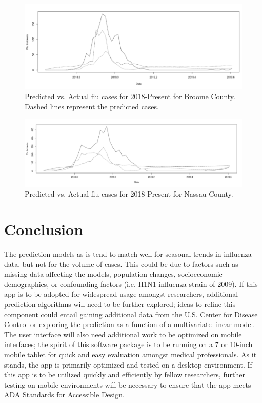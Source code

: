 \documentclass[12pt]{article}
\begin{document}
\begin{figure}[H]
\centering
\includegraphics{Picture5.png}
\caption{Predicted vs. Actual flu cases for 2018-Present for Broome County. Dashed lines represent the predicted cases.}\label{fig:broome}
\end{figure}

\begin{figure}[H]
\centering
\includegraphics{Picture6.png}
\caption{Predicted vs. Actual flu cases for 2018-Present for Nassau County.}\label{fig:nassau}
\end{figure}
 
\section{Conclusion}

The prediction models as-is tend to match well for seasonal trends in influenza data, but not for the volume of cases. This could be due to factors such as missing data affecting the models, population changes, socioeconomic demographics, or confounding factors (i.e. H1N1 influenza strain of 2009). If this app is to be adopted for widespread usage amongst researchers, additional prediction algorithms will need to be further explored; ideas to refine this component could entail gaining additional data from the U.S. Center for Disease Control or exploring the prediction as a function of a multivariate linear model. The user interface will also need additional work to be optimized on mobile interfaces; the spirit of this software package is to be running on a 7 or 10-inch mobile tablet for quick and easy evaluation amongst medical professionals. As it stands, the app is primarily optimized and tested on a desktop environment. If this app is to be utilized quickly and efficiently by fellow researchers, further testing on mobile environments will be necessary to ensure that the app meets ADA Standards for Accessible Design.

\newpage
\nocite{*}


\end{document}
